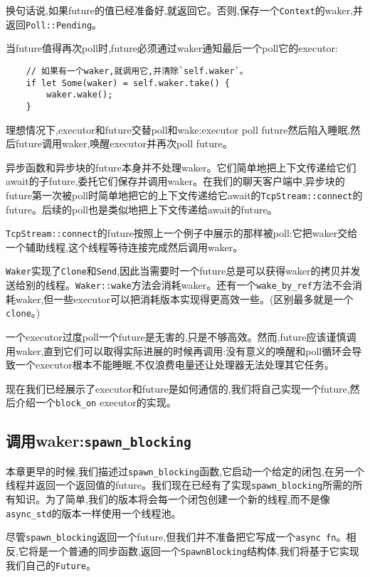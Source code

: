 换句话说,如果future的值已经准备好,就返回它。否则,保存一个\texttt{Context}的waker,并返回\texttt{Poll::Pending}。

当future值得再次poll时,future必须通过waker通知最后一个poll它的executor:
\begin{verbatim}
    // 如果有一个waker,就调用它,并清除`self.waker`。
    if let Some(waker) = self.waker.take() {
        waker.wake();
    }
\end{verbatim}

理想情况下,executor和future交替poll和wake:executor poll future然后陷入睡眠,然后future调用waker,唤醒executor并再次poll future。

异步函数和异步块的future本身并不处理waker。它们简单地把上下文传递给它们await的子future,委托它们保存并调用waker。在我们的聊天客户端中,异步块的future第一次被poll时简单地把它的上下文传递给它await的\texttt{TcpStream::connect}的future。后续的poll也是类似地把上下文传递给await的future。

\texttt{TcpStream::connect}的future按照上一个例子中展示的那样被poll:它把waker交给一个辅助线程,这个线程等待连接完成然后调用waker。

\texttt{Waker}实现了\texttt{Clone}和\texttt{Send},因此当需要时一个future总是可以获得waker的拷贝并发送给别的线程。\texttt{Waker::wake}方法会消耗waker。还有一个\texttt{wake\_by\_ref}方法不会消耗waker,但一些executor可以把消耗版本实现得更高效一些。(区别最多就是一个\texttt{clone}。)

一个executor过度poll一个future是无害的,只是不够高效。然而,future应该谨慎调用waker,直到它们可以取得实际进展的时候再调用:没有意义的唤醒和poll循环会导致一个executor根本不能睡眠,不仅浪费电量还让处理器无法处理其它任务。

现在我们已经展示了executor和future是如何通信的,我们将自己实现一个future,然后介绍一个\texttt{block\_on} executor的实现。

\subsection{调用waker:\texttt{spawn\_blocking}}\label{InvokeWaker}
本章更早的时候,我们描述过\texttt{spawn\_blocking}函数,它启动一个给定的闭包,在另一个线程并返回一个返回值的future。我们现在已经有了实现\texttt{spawn\_blocking}所需的所有知识。为了简单,我们的版本将会每一个闭包创建一个新的线程,而不是像\texttt{async\_std}的版本一样使用一个线程池。

尽管\texttt{spawn\_blocking}返回一个future,但我们并不准备把它写成一个\texttt{async fn}。相反,它将是一个普通的同步函数,返回一个\texttt{SpawnBlocking}结构体,我们将基于它实现我们自己的\texttt{Future}。

